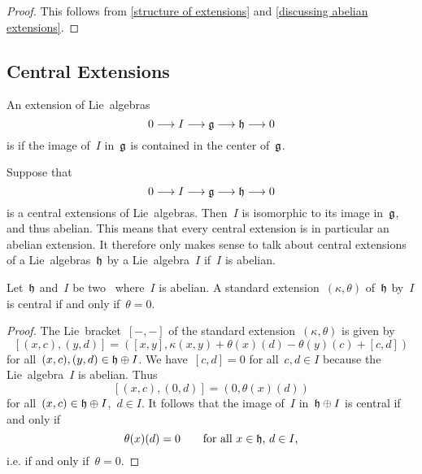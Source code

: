 \begin{proof}
  This follows from \cref{structure of extensions} and \cref{discussing abelian extensions}.
\end{proof}



\subsection{Central Extensions}

\begin{definition}
  An extension of Lie~algebras
  \[
    0 \to I \to \glie \to \hlie \to 0
  \]
  is  if the image of~$I$ in~$\mathfrak{g}$ is contained in the center of~$\mathfrak{g}$.
\end{definition}


\begin{remark}
  Suppose that
  \[
    0 \to I \to \glie \to \hlie \to 0
  \]
  is a central extensions of Lie~algebras.
  Then~$I$ is isomorphic to its image in~$\mathfrak{g}$, and thus abelian.
  This means that every central extension is in particular an abelian extension.
  It therefore only makes sense to talk about central extensions of a Lie~algebras~$\mathfrak{h}$ by a Lie~algebra~$I$ if~$I$ is abelian.
\end{remark}


\begin{proposition}
  \label{central iff theta is zero}
  Let~$\mathfrak{h}$ and~$I$ be two~\liealgebras{$\kf$} where~$I$ is abelian.
  A standard extension~$(\kappa, \theta)$ of~$\mathfrak{h}$ by~$I$ is central if and only if~$\theta = 0$.
\end{proposition}


\begin{proof}
  The Lie~bracket~$[-,-]$ of the standard extension~$(\kappa, \theta)$ is given by
  \[
    [ (x,c), (y,d) ]
    =
    ( [x,y], \kappa(x,y) + \theta(x)(d) - \theta(y)(c) + [c,d] )
  \]
  for all~$(x,c), (y,d) \in \mathfrak{h} \oplus I$.
  We have~$[c,d] = 0$ for all~$c, d \in I$ because the Lie~algebra~$I$ is abelian.
  Thus
  \[
    [ (x,c), (0,d) ]
    =
    ( 0, \theta(x)(d) )
  \]
  for all~$(x,c) \in \mathfrak{h} \oplus I$,~$d \in I$.
  It follows that the image of~$I$ in~$\mathfrak{h} \oplus I$ is central if and only if
  \[
    \theta(x)(d) = 0
    \qquad
    \text{for all~$x \in \mathfrak{h}$,~$d \in I$,}
  \]
  i.e. if and only if~$\theta = 0$.
\end{proof}



